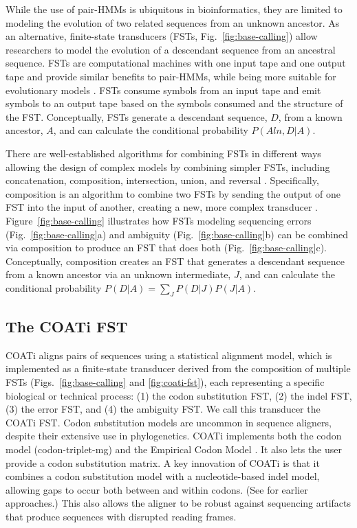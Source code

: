 \documentclass[12pt,letterpaper]{article}
\begin{document}
While the use of pair-HMMs is ubiquitous in bioinformatics, they are limited to modeling the evolution of two related sequences from an unknown ancestor. As an alternative, finite-state transducers (FSTs, Fig.~\ref{fig:base-calling}) allow researchers to model the evolution of a descendant sequence from an ancestral sequence. FSTs are computational machines with one input tape and one output tape and provide similar benefits to pair-HMMs, while being more suitable for evolutionary models \citep{bradley2007transducers}. FSTs consume symbols from an input tape and emit symbols to an output tape based on the symbols consumed and the structure of the FST. Conceptually, FSTs generate a descendant sequence, $D$, from a known ancestor, $A$, and can calculate the conditional probability $P(Aln, D | A)$.

There are well-established algorithms for combining FSTs in different ways allowing the design of complex models by combining simpler FSTs, including concatenation, composition, intersection, union, and reversal \citep{bradley2007transducers,silvestre2021machine}. Specifically, composition is an algorithm to combine two FSTs by sending the output of one FST into the input of another, creating a new, more complex transducer \citep{mohri2005weighted}. Figure~\ref{fig:base-calling} illustrates how FSTs modeling sequencing errors (Fig.~\ref{fig:base-calling}a) and ambiguity (Fig.~\ref{fig:base-calling}b) can be combined via composition to produce an FST that does both (Fig.~\ref{fig:base-calling}c). Conceptually, composition creates an FST that generates a descendant sequence from a known ancestor via an unknown intermediate, $J$, and can calculate the conditional probability $P(D|A) = \sum_{J} P(D|J)P(J|A)$. 

\subsection*{The COATi FST}

COATi aligns pairs of sequences using a statistical alignment model, which is implemented as a finite-state transducer derived from the composition of multiple FSTs (Figs.~\ref{fig:base-calling} and \ref{fig:coati-fst}), each representing a specific biological or technical process: (1) the codon substitution FST, (2) the indel FST, (3) the error FST, and (4) the ambiguity FST. We call this transducer the COATi FST. Codon substitution models are uncommon in sequence aligners, despite their extensive use in phylogenetics. COATi implements both the \cite{muse_gaut_1994} codon model (codon-triplet-mg) and the Empirical Codon Model \citep[codon-triplet-ecm;][]{kosiol_ECM_2007}.
It also lets the user provide a codon substitution matrix. A key innovation of COATi is that it combines a codon substitution model with a nucleotide-based indel model, allowing gaps to occur both between and within codons. (See \citealt{hein1994algorithm,arvestad1997aligning,pedersen1998comparison,ranwez_macse_2011,ranwez_macse_2018} for earlier approaches.) This also allows the aligner to be robust against sequencing artifacts that produce sequences with disrupted reading frames.
\end{document}
